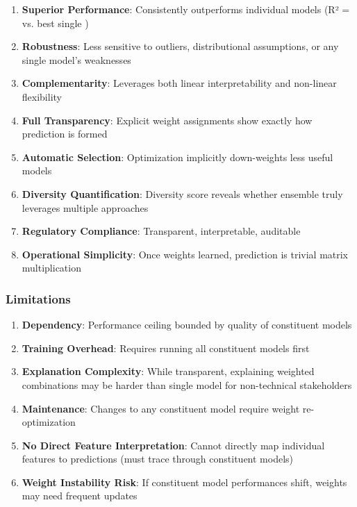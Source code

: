 \begin{enumerate}
    \item \textbf{Superior Performance}: Consistently outperforms individual models (R² = \ModelElevenRSquaredTest{} vs. best single \ModelNineRSquaredTest{})
    
    \item \textbf{Robustness}: Less sensitive to outliers, distributional assumptions, or any single model's weaknesses
    
    \item \textbf{Complementarity}: Leverages both linear interpretability and non-linear flexibility
    
    \item \textbf{Full Transparency}: Explicit weight assignments show exactly how prediction is formed
    
    \item \textbf{Automatic Selection}: Optimization implicitly down-weights less useful models
    
    \item \textbf{Diversity Quantification}: Diversity score reveals whether ensemble truly leverages multiple approaches
    
    \item \textbf{Regulatory Compliance}: Transparent, interpretable, auditable
    
    \item \textbf{Operational Simplicity}: Once weights learned, prediction is trivial matrix multiplication
\end{enumerate}

\subsubsection{Limitations}

\begin{enumerate}
    \item \textbf{Dependency}: Performance ceiling bounded by quality of constituent models
    
    \item \textbf{Training Overhead}: Requires running all constituent models first
    
    \item \textbf{Explanation Complexity}: While transparent, explaining weighted combinations may be harder than single model for non-technical stakeholders
    
    \item \textbf{Maintenance}: Changes to any constituent model require weight re-optimization
    
    \item \textbf{No Direct Feature Interpretation}: Cannot directly map individual features to predictions (must trace through constituent models)
    
    \item \textbf{Weight Instability Risk}: If constituent model performances shift, weights may need frequent updates
\end{enumerate}

